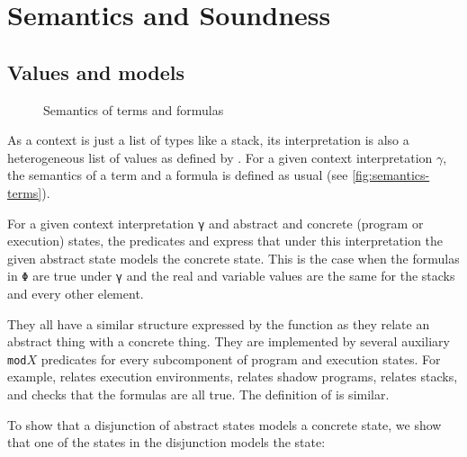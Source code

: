\section{Semantics and Soundness}
\label{sec:semantics-soundness}

\subsection{Values and models}\label{sec:values&models}

\begin{figure}[tp]
  \SemanticsTerms
  \SemanticsFormulas
  \caption{Semantics of terms and formulas}
  \label{fig:semantics-terms}
\end{figure}

As a context is just a list of types like a stack, its interpretation
is also a heterogeneous list of values as defined by .
For a given context interpretation $\gamma$, the semantics of a term
and a formula is defined as usual
(see \autoref{fig:semantics-terms}).

For a given context interpretation \verb/γ/ and abstract and concrete (program or execution) states,
the predicates  and  express that
under this interpretation the given abstract state models the concrete state.
This is the case when the formulas in \verb/Φ/ are true under \verb/γ/ and
the real and variable values are the same for the stacks and every
other element.
\SemanticsMODELING
\SemanticsModRho

They all have a similar structure expressed by the 
function as they relate an abstract thing with a concrete thing. They
are implemented by several auxiliary \verb/mod/$X$ predicates for every
subcomponent of program and execution states. For example, 
relates execution environments,  relates shadow programs,
 relates stacks, and  checks that the formulas
are all true. The definition of  is similar.

To show that a disjunction of abstract states models a concrete state,
we show that one of the states in the disjunction models the state:
\SemanticsModUS


